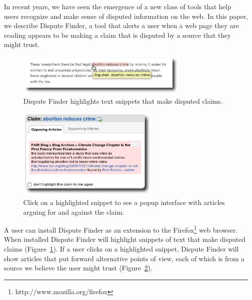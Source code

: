 \documentclass{www2010-submission}
\newcommand{\todo}[1]{}
\begin{document}
In recent years, we have seen the emergence of a new class of tools that help users recognize and make sense of disputed information on the web. In this paper, we describe Dispute Finder, a tool that alerts a user when a web page they are reading appears to be making a claim that is disputed by a source that they might trust.

\begin{figure}[tb]
	\begin{center}
	\includegraphics[width=8.5cm]{pictures/highlight_abortion.png}
	\caption{Dispute Finder highlights text snippets that make disputed claims.}
	\label{highlight}
	\end{center}
\end{figure}

\begin{figure}[tb]
	\begin{center}
	\includegraphics[width=7cm]{pictures/popup_abortion_shadow.png}
	\caption{Click on a highlighted snippet to see a popup interface with articles arguing for and against the claim.}
	\label{claimview}
	\end{center}
\end{figure}
\todo{Popup interface should contain a ``don't mark this'' button}

\todo{More screenshots/graphs/visual information}

\todo{word this better}\todo{update all screenshots}


A user can install Dispute Finder as an extension to the Firefox\footnote{http://www.mozilla.org/firefox} web browser. When installed Dispute Finder will highlight snippets of text that make disputed claims (Figure~\ref{highlight}). 
If a user clicks on a highlighted snippet, Dispute Finder will show articles that put forward alternative points of view,  each of which is from a source we believe the user might trust (Figure~\ref{claimview}). 
\end{document}
